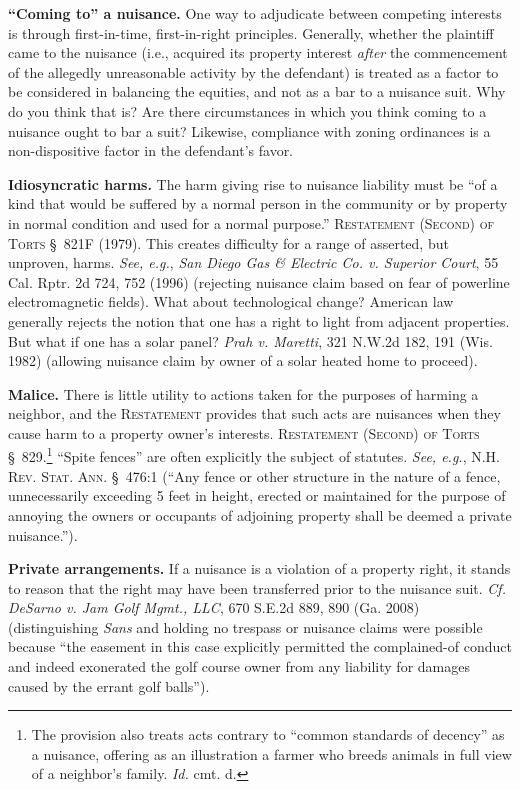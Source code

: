 \item \textbf{``Coming to'' a nuisance.} One way to adjudicate between
competing interests is through first-in-time, first-in-right principles.
Generally, whether the plaintiff came to the nuisance (i.e., acquired its
property interest \textit{after} the commencement of the allegedly unreasonable
activity by the defendant) is treated as a factor to be considered in balancing
the equities, and not as a bar to a nuisance suit. Why do you think that is? Are
there circumstances in which you think coming to a nuisance ought to bar a suit?
Likewise, compliance with zoning ordinances is a non-dispositive factor in the
defendant's favor. 

\item \textbf{Idiosyncratic harms.} The harm giving rise to nuisance liability
must be ``of a kind that would be suffered by a normal person in the community
or by property in normal condition and used for a normal purpose.''
\textsc{Restatement (Second) of Torts} \S~821F (1979). This creates difficulty
for a range of asserted, but unproven, harms. \textit{See, e.g.}, \emph{San
Diego Gas \& Electric Co. v. Superior Court}, 55 Cal. Rptr. 2d 724, 752 (1996)
(rejecting nuisance claim based on fear of powerline electromagnetic fields).
What about technological change? American law generally rejects the notion that
one has a right to light from adjacent properties. But what if one has a solar
panel? \emph{Prah v. Maretti}, 321 N.W.2d 182, 191 (Wis. 1982) (allowing
nuisance claim by owner of a solar heated home to proceed). 

\item \textbf{Malice.} There is little utility to actions taken for the purposes
of harming a neighbor, and the \textsc{Restatement} provides that such acts are
nuisances when they cause harm to a property owner's interests.
\textsc{Restatement (Second) of Torts} \S~829.\footnote{The provision also
treats acts contrary to ``common standards of decency'' as a nuisance, offering
as an illustration a farmer who breeds animals in full view of a neighbor's
family. \textit{Id.} cmt. d.} ``Spite fences'' are often explicitly the subject
of statutes. \textit{See, e.g.}, \textsc{N.H. Rev. Stat. Ann.} \S~476:1 (``Any
fence or other structure in the nature of a fence, unnecessarily exceeding 5
feet in height, erected or maintained for the purpose of annoying the owners or
occupants of adjoining property shall be deemed a private nuisance.'').

\item \textbf{Private arrangements.} If a nuisance is a violation of a property
right, it stands to reason that the right may have been transferred prior to the
nuisance suit. \textit{Cf.} \emph{DeSarno v. Jam Golf Mgmt., LLC}, 670 S.E.2d
889, 890 (Ga. 2008) (distinguishing \textit{Sans} and holding no trespass or
nuisance claims were possible because ``the easement in this case explicitly
permitted the complained-of conduct and indeed exonerated the golf course owner
from any liability for damages caused by the errant golf balls'').

